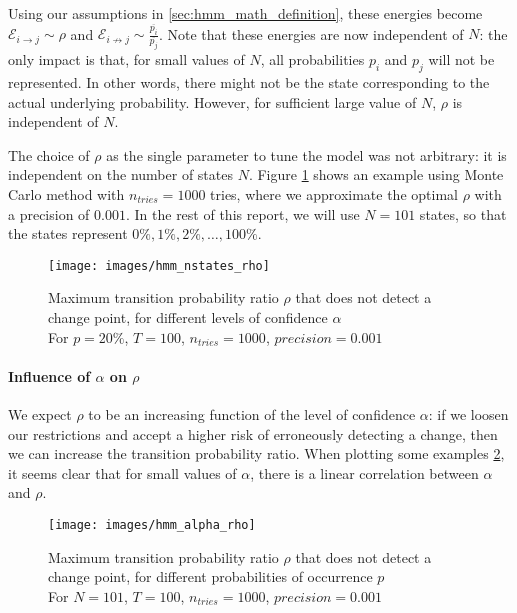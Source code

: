 \documentclass{kththesis}
\begin{document}
Using our assumptions in \ref{sec:hmm_math_definition}, these energies become $\mathcal{E}_{i \rightarrow j} \sim \rho$ and $\mathcal{E}_{i \not\rightarrow j} \sim \frac{\overline{p_i}}{\overline{p_j}}$.
Note that these energies are now independent of $N$: the only impact is that, for small values of $N$, all probabilities $p_i$ and $p_j$ will not be represented. In other words, there might not be the state corresponding to the actual underlying probability. However, for sufficient large value of $N$, $\rho$ is independent of $N$.
 
The choice of $\rho$ as the single parameter to tune the model was not arbitrary: it is independent on the number of states $N$. Figure \ref{fig:hmm_nstates_rho} shows an example using Monte Carlo method with $n_{tries}=1000$ tries, where we approximate the optimal $\rho$ with a precision of $0.001$. In the rest of this report, we will use $N=101$ states, so that the states represent $0\%, 1\%, 2\%, \ldots, 100\%$.

\begin{figure}[ht]
\hspace{-50pt}
\texttt{[image: images/hmm\_nstates\_rho]}
\caption[caption]{Maximum transition probability ratio $\rho$ that does not detect a change point, for different levels of confidence $\alpha$\\
For $p = 20\%$, $T = 100$, $n_{tries} = 1000$, $precision=0.001$}
\label{fig:hmm_nstates_rho}
\end{figure}


\paragraph{Influence of $\alpha$ on $\rho$}

We expect $\rho$ to be an increasing function of the level of confidence $\alpha$: if we loosen our restrictions and accept a higher risk of erroneously detecting a change, then we can increase the transition probability ratio. When plotting some examples \ref{fig:hmm_alpha_rho}, it seems clear that for small values of $\alpha$, there is a linear correlation between $\alpha$ and $\rho$.

\begin{figure}[ht]
\hspace{-50pt}
\texttt{[image: images/hmm\_alpha\_rho]}
\caption[caption]{Maximum transition probability ratio $\rho$ that does not detect a change point, for different probabilities of occurrence $p$\\
For $N = 101$, $T = 100$, $n_{tries} = 1000$, $precision=0.001$}
\label{fig:hmm_alpha_rho}
\end{figure}
\end{document}
